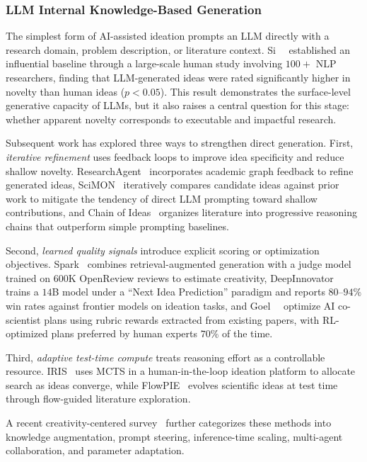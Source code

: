 \subsubsection{LLM Internal Knowledge-Based Generation}
\label{sec:idea_internal}

The simplest form of AI-assisted ideation prompts an LLM directly with a research domain, problem description, or literature context. Si~\etal~\cite{si2024ideas} established an influential baseline through a large-scale human study involving $100+$ NLP researchers, finding that LLM-generated ideas were rated significantly higher in novelty than human ideas ($p<0.05$). This result demonstrates the surface-level generative capacity of LLMs, but it also raises a central question for this stage: whether apparent novelty corresponds to executable and impactful research.

Subsequent work has explored three ways to strengthen direct generation. First, \emph{iterative refinement} uses feedback loops to improve idea specificity and reduce shallow novelty. ResearchAgent~\cite{baek2024researchagent} incorporates academic graph feedback to refine generated ideas, SciMON~\cite{wang2024scimon} iteratively compares candidate ideas against prior work to mitigate the tendency of direct LLM prompting toward shallow contributions, and Chain of Ideas~\cite{li2024chainofideas} organizes literature into progressive reasoning chains that outperform simple prompting baselines. 

Second, \emph{learned quality signals} introduce explicit scoring or optimization objectives. Spark~\cite{sanyal2025spark} combines retrieval-augmented generation with a judge model trained on $600$K OpenReview reviews to estimate creativity, DeepInnovator~\cite{deepinnovator2026} trains a $14$B model under a ``Next Idea Prediction'' paradigm and reports $80$--$94\%$ win rates against frontier models on ideation tasks, and Goel~\etal~\cite{rubricrewards2025} optimize AI co-scientist plans using rubric rewards extracted from existing papers, with RL-optimized plans preferred by human experts $70\%$ of the time. 

Third, \emph{adaptive test-time compute} treats reasoning effort as a controllable resource. IRIS~\cite{iris2025} uses MCTS in a human-in-the-loop ideation platform to allocate search as ideas converge, while FlowPIE~\cite{flowpie2026} evolves scientific ideas at test time through flow-guided literature exploration. 

A recent creativity-centered survey~\cite{shahhosseini2025ideationsurvey} further categorizes these methods into knowledge augmentation, prompt steering, inference-time scaling, multi-agent collaboration, and parameter adaptation.



